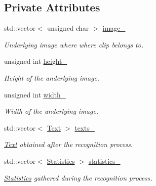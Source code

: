 \subsection*{Private Attributes}
\begin{CompactItemize}
\item 
\hypertarget{class_recognizer_11fc98298edb98302bdd69e71dfb8d13}{
std::vector$<$ unsigned char $>$ \hyperlink{class_recognizer_11fc98298edb98302bdd69e71dfb8d13}{image\_\-}}
\label{class_recognizer_11fc98298edb98302bdd69e71dfb8d13}

\begin{CompactList}\small\item\em Underlying image where where clip belongs to. \item\end{CompactList}\item 
\hypertarget{class_recognizer_c9da570bfac5adee1dcd253fc76ab747}{
unsigned int \hyperlink{class_recognizer_c9da570bfac5adee1dcd253fc76ab747}{height\_\-}}
\label{class_recognizer_c9da570bfac5adee1dcd253fc76ab747}

\begin{CompactList}\small\item\em Height of the underlying image. \item\end{CompactList}\item 
\hypertarget{class_recognizer_401c3d8736c8779ad69f92c4c2703c26}{
unsigned int \hyperlink{class_recognizer_401c3d8736c8779ad69f92c4c2703c26}{width\_\-}}
\label{class_recognizer_401c3d8736c8779ad69f92c4c2703c26}

\begin{CompactList}\small\item\em Width of the underlying image. \item\end{CompactList}\item 
\hypertarget{class_recognizer_853b3b92f3e02587e949acba44ec0e2e}{
std::vector$<$ \hyperlink{class_text}{Text} $>$ \hyperlink{class_recognizer_853b3b92f3e02587e949acba44ec0e2e}{texts\_\-}}
\label{class_recognizer_853b3b92f3e02587e949acba44ec0e2e}

\begin{CompactList}\small\item\em \hyperlink{class_text}{Text} obtained after the recognition process. \item\end{CompactList}\item 
\hypertarget{class_recognizer_c30a3d75c7c7cc3b3422f5aa4f594b5a}{
std::vector$<$ \hyperlink{class_statistics}{Statistics} $>$ \hyperlink{class_recognizer_c30a3d75c7c7cc3b3422f5aa4f594b5a}{statistics\_\-}}
\label{class_recognizer_c30a3d75c7c7cc3b3422f5aa4f594b5a}

\begin{CompactList}\small\item\em \hyperlink{class_statistics}{Statistics} gathered during the recognition process. \item\end{CompactList}\end{CompactItemize}


